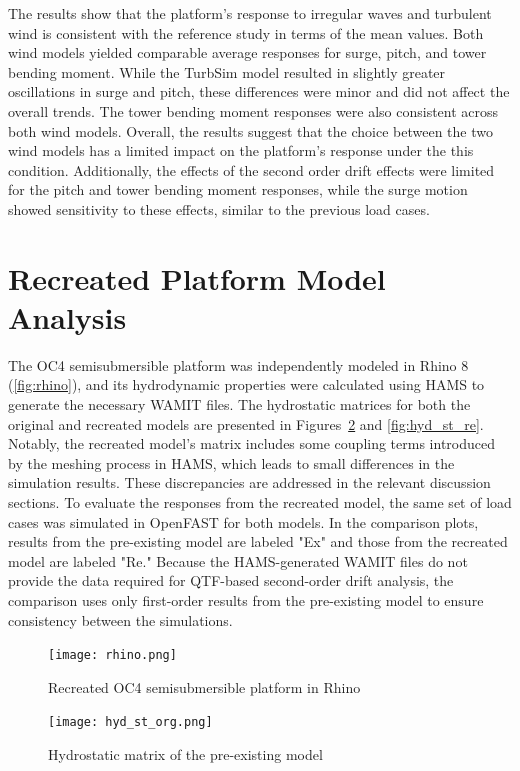 \documentclass[a4paper, 11pt]{article}
\begin{document}
The results show that the platform's response to irregular waves and turbulent wind is consistent with the reference study in terms of the mean values. Both wind models yielded comparable average responses for surge, pitch, and tower bending moment. While the TurbSim model resulted in slightly greater oscillations in surge and pitch, these differences were minor and did not affect the overall trends. The tower bending moment responses were also consistent across both wind models. Overall, the results suggest that the choice between the two wind models has a limited impact on the platform’s response under the this condition. 
Additionally, the effects of the second order drift effects were limited for the pitch and tower bending moment responses, while the surge motion showed sensitivity to these effects, similar to the previous load cases. 

\section{Recreated Platform Model Analysis}

\hspace*{0.5cm}The OC4 semisubmersible platform was independently modeled in Rhino 8 (\autoref{fig:rhino}), and its hydrodynamic properties were calculated using HAMS to generate the necessary WAMIT files. The hydrostatic matrices for both the original and recreated models are presented in Figures~\ref{fig:hyd_st_org} and \ref{fig:hyd_st_re}. Notably, the recreated model’s matrix includes some coupling terms introduced by the meshing process in HAMS, which leads to small differences in the simulation results. These discrepancies are addressed in the relevant discussion sections. To evaluate the responses from the recreated model, the same set of load cases was simulated in OpenFAST for both models. In the comparison plots, results from the pre-existing model are labeled "Ex" and those from the recreated model are labeled "Re." Because the HAMS-generated WAMIT files do not provide the data required for QTF-based second-order drift analysis, the comparison uses only first-order results from the pre-existing model to ensure consistency between the simulations.

\begin{figure}[H]
    \centering
    \texttt{[image: rhino.png]}
    \caption{\small Recreated OC4 semisubmersible platform in Rhino}
    \label{fig:rhino}
\end{figure}

\begin{figure}[H]
    \centering
    \texttt{[image: hyd\_st\_org.png]}
    \caption{\small Hydrostatic matrix of the pre-existing model}
    \label{fig:hyd_st_org}
\end{figure}
\end{document}
